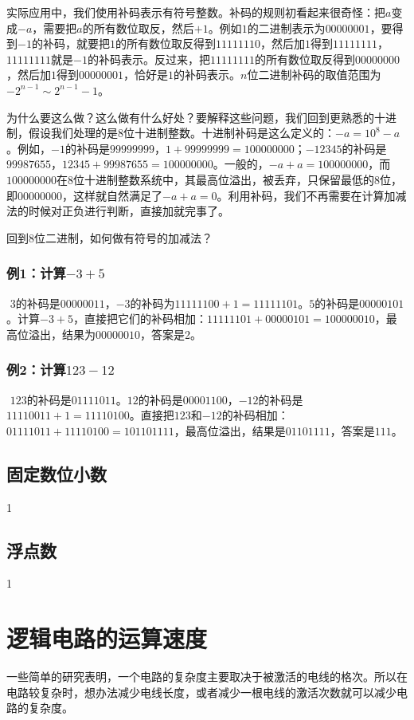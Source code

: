 实际应用中，我们使用补码表示有符号整数。补码的规则初看起来很奇怪：把$a$变成$-a$，需要把$a$的所有数位取反，然后$+1$。例如$1$的二进制表示为$00000001$，要得到$-1$的补码，就要把$1$的所有数位取反得到$11111110$，然后加$1$得到$11111111$，\phantom{} $11111111$就是$-1$的补码表示。反过来，把$11111111$的所有数位取反得到$00000000$，然后加$1$得到$00000001$，恰好是$1$的补码表示。$n$位二进制补码的取值范围为$-2^{n-1}\sim2^{n-1}-1$。

为什么要这么做？这么做有什么好处？要解释这些问题，我们回到更熟悉的十进制，假设我们处理的是8位十进制整数。十进制补码是这么定义的：$-a=10^8-a$。例如，$-1$的补码是$99999999$，$1+99999999=100000000$；$-12345$的补码是$99987655$，$12345+99987655=100000000$。一般的，$-a+a=100000000$，而$100000000$在8位十进制整数系统中，其最高位溢出，被丢弃，只保留最低的8位，即$00000000$，这样就自然满足了$-a+a=0$。利用补码，我们不再需要在计算加减法的时候对正负进行判断，直接加就完事了。

回到8位二进制，如何做有符号的加减法？
\subsubsection*{例1：计算$-3+5$}$ $
$3$的补码是$00000011$，$-3$的补码为$11111100+1=11111101$。$5$的补码是$00000101$。计算$-3+5$，直接把它们的补码相加：$11111101+00000101=1 00000010$，最高位溢出，结果为$00000010$，答案是2。

\subsubsection*{例2：计算$123-12$}$ $
$123$的补码是$01111011$。$12$的补码是$00001100$，$-12$的补码是$11110011+1=11110100$。直接把$123$和$-12$的补码相加：$01111011+11110100=1 01101111$，最高位溢出，结果是$01101111$，答案是$111$。

\subsection{固定数位小数}
1
\subsection{浮点数}
1

\section{逻辑电路的运算速度}
一些简单的研究表明，一个电路的复杂度主要取决于被激活的电线的格次。所以在电路较复杂时，想办法减少电线长度，或者减少一根电线的激活次数就可以减少电路的复杂度。

